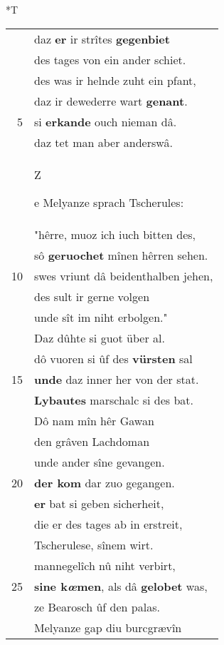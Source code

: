 \documentclass[8pt,a4paper,notitlepage]{article}
\begin{document}
\begin{table}[ht]
\begin{minipage}[t]{0.5\linewidth}
\end{minipage}
\hspace{0.5cm}
\begin{minipage}[t]{0.5\linewidth}
\small
\begin{center}*T
\end{center}
\begin{tabular}{rl}
 & daz \textbf{er} ir strîtes \textbf{gegenbiet}\\ 
 & des tages von ein ander schiet.\\ 
 & des was ir helnde zuht ein pfant,\\ 
 & daz ir dewederre wart \textbf{genant}.\\ 
5 & si \textbf{erkande} ouch nieman dâ.\\ 
 & daz tet man aber anderswâ.\\ 
 & \begin{large}Z\end{large}e Melyanze sprach Tscherules:\\ 
 & "hêrre, muoz ich iuch bitten des,\\ 
 & sô \textbf{geruochet} mînen hêrren sehen.\\ 
10 & swes vriunt dâ beidenthalben jehen,\\ 
 & des sult ir gerne volgen\\ 
 & unde sît im niht erbolgen."\\ 
 & Daz dûhte si guot über al.\\ 
 & dô vuoren si ûf des \textbf{vürsten} sal\\ 
15 & \textbf{unde} daz inner her von der stat.\\ 
 & \textbf{Lybautes} marschalc si des bat.\\ 
 & Dô nam mîn hêr Gawan\\ 
 & den grâven Lachdoman\\ 
 & unde ander sîne gevangen.\\ 
20 & \textbf{der kom} dar zuo gegangen.\\ 
 & \textbf{er} bat si geben sicherheit,\\ 
 & die er des tages ab in erstreit,\\ 
 & Tscherulese, sînem wirt.\\ 
 & mannegelîch nû niht verbirt,\\ 
25 & \textbf{sine k\textit{œ}men}, als dâ \textbf{gelobet} was,\\ 
 & ze Bearosch ûf den palas.\\ 
 & Melyanze gap diu burcgrævîn\\ 

\end{tabular}
\end{minipage}
\end{table}
\end{document}
